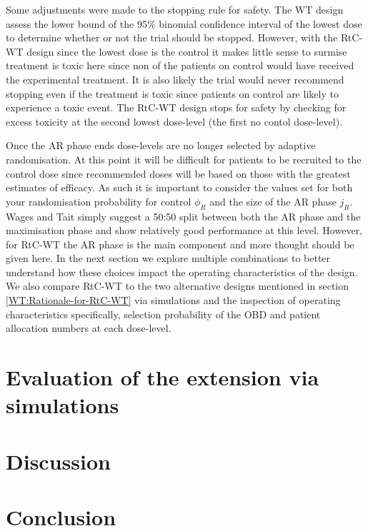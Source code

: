 Some adjustments were made to the stopping rule for safety. The WT design assess the lower bound of the 95\% binomial confidence interval of the lowest dose to determine whether or not the trial should be stopped. However, with the RtC-WT design since the lowest dose is the control it makes little sense to surmise treatment is toxic here since non of the patients on control would have received the experimental treatment. It is also likely the trial would never recommend stopping even if the treatment is toxic since patients on control are likely to experience a toxic event. The RtC-WT design stops for safety by checking for excess toxicity at the second lowest dose-level (the first no contol dose-level). 

Once the AR phase ends dose-levels are no longer selected by adaptive randomisation. At this point it will be difficult for patients to be recruited to the control dose since recommended doses will be based on those with the greatest estimates of efficacy. As such it is important to consider the values set for both your randomisation probability for control $\phi_R$ and the size of the AR phase $j_R$. Wages and Tait simply suggest a 50:50 split between both the AR phase and the maximisation phase and show relatively good performance at this level. However, for RtC-WT the AR phase is the main component and more thought should be given here. In the next section we explore multiple combinations to better understand how these choices impact the operating characteristics of the design. We also compare RtC-WT to the two alternative designs mentioned in section  \ref{WT:Rationale-for-RtC-WT} via simulations and the inspection of operating characteristics specifically, selection probability of the OBD and patient allocation numbers at each dose-level. 
 
 
 \section{Evaluation of the extension via simulations}
 \label{WT:Evaluation-of-the-Extension}
 
 \section{Discussion}
 \label{WT:Discussion}
 
 \section{Conclusion}
 \label{WT:Conclusion}